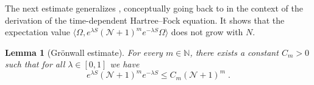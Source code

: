 \documentclass[12pt,a4paper]{article}
\numberwithin{equation}{section}
\newcommand{\NNN}{\mathbb{N}}
\newcommand{\1}{\mathbb{I}}
\newcommand{\HS}{\mathrm{HS}}
\newcommand{\Z}{\mathbb{Z}}
\newcommand{\NN}{\mathcal{N}}
\theoremstyle{plain}
\newtheorem{lemma}[theorem]{Lemma}
\theoremstyle{definition}
\theoremstyle{remark}
\theoremstyle{plain}
\theoremstyle{definition}
\theoremstyle{remark}
\begin{document}
The next estimate generalizes \cite[Prop.~5.8]{CHN21}, conceptually going back to \cite{BJPSS16,BPS14} in the context of the derivation of the time-dependent Hartree--Fock equation. It shows that the expectation value $ \langle \Omega, e^{\lambda S} (\mathcal{N} + 1)^m e^{-\lambda S} \Omega \rangle$ does not grow with $N$.

\begin{lemma}[Gr\"onwall estimate]\label{lem:gronNest}
For every $ m \in \NNN $, there exists a constant $ C_m > 0 $ such that for all $ \lambda\in [0,1]$ we have
\begin{equation}\label{eq:gronest}
	e^{\lambda S} (\mathcal{N} +1)^m e^{-\lambda S}
	\leq C_m (\NN+1)^m \;.
\end{equation}
\end{lemma}
\end{document}
